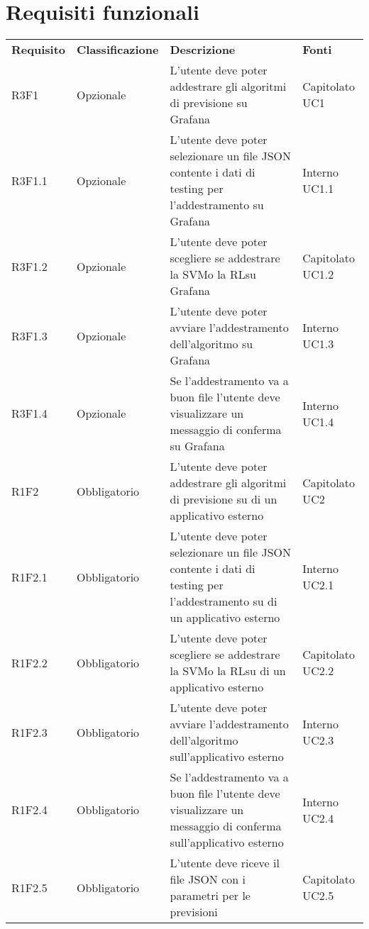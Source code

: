 \section{Requisiti funzionali}
	\begin{longtable} {
		>{}p{24mm} 
		>{}p{32mm}
		>{}p{40mm} 
		>{}p{24.5mm}
		}
	\rowcolor{gray!50}
		\textbf{Requisito} & \textbf{Classificazione} & \textbf{Descrizione} & \textbf{Fonti} 	\TBstrut \\
		R3F1 & Opzionale & L'utente deve poter addestrare gli algoritmi di previsione su Grafana\glo & Capitolato UC1 \TBstrut \\ [2mm]
		R3F1.1 & Opzionale & L'utente deve poter selezionare un file JSON contente i dati di testing per l'addestramento su Grafana\glo & Interno UC1.1 \TBstrut \\ [2mm]
		R3F1.2 & Opzionale & L'utente deve poter scegliere se addestrare la SVM\glosp o la RL\glosp su Grafana\glo & Capitolato UC1.2 \TBstrut \\ [2mm]
		R3F1.3 & Opzionale & L'utente deve poter avviare l'addestramento dell'algoritmo su Grafana\glo & Interno UC1.3 \TBstrut \\ [2mm]
		R3F1.4 & Opzionale & Se l'addestramento va a buon file l'utente deve visualizzare un messaggio di conferma su Grafana\glo & Interno UC1.4 \TBstrut \\ [2mm]
		R1F2 & Obbligatorio & L'utente deve poter addestrare gli algoritmi di previsione su di un applicativo esterno & Capitolato UC2 \TBstrut \\ [2mm]
		R1F2.1 & Obbligatorio & L'utente deve poter selezionare un file JSON contente i dati di testing per l'addestramento su di un applicativo esterno & Interno UC2.1 \TBstrut \\ [2mm]
		R1F2.2 & Obbligatorio & L'utente deve poter scegliere se addestrare la SVM\glosp o la RL\glosp su di un applicativo esterno & Capitolato UC2.2 \TBstrut \\ [2mm]
		R1F2.3 & Obbligatorio & L'utente deve poter avviare l'addestramento dell'algoritmo sull'applicativo esterno & Interno UC2.3 \TBstrut \\ [2mm]
		R1F2.4 & Obbligatorio & Se l'addestramento va a buon file l'utente deve visualizzare un messaggio di conferma sull'applicativo esterno & Interno UC2.4 \TBstrut \\ [2mm]
		R1F2.5 & Obbligatorio & L'utente deve riceve il file JSON con i parametri per le previsioni & Capitolato UC2.5 \TBstrut \\ [2mm]

\end{longtable}
